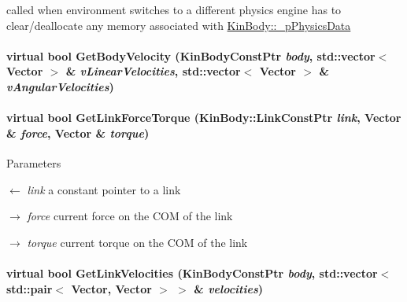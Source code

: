 called when environment switches to a different physics engine has to clear/deallocate any memory associated with \hyperlink{classOpenRAVE_1_1KinBody_a3f8a2e40760cf2ee75f604c0f18b27ec}{KinBody::\_\-pPhysicsData} \hypertarget{classOpenRAVE_1_1PhysicsEngineBase_a1a58013a452eea3921fb0ddcfb263813}{
\paragraph[{GetBodyVelocity}]{\setlength{\rightskip}{0pt plus 5cm}virtual bool GetBodyVelocity (KinBodyConstPtr {\em body}, \/  std::vector$<$ Vector $>$ \& {\em vLinearVelocities}, \/  std::vector$<$ Vector $>$ \& {\em vAngularVelocities})}\hfill}
\label{classOpenRAVE_1_1PhysicsEngineBase_a1a58013a452eea3921fb0ddcfb263813}
\hypertarget{classOpenRAVE_1_1PhysicsEngineBase_ac1814e555930327871aa74a002eb11ec}{
\paragraph[{GetLinkForceTorque}]{\setlength{\rightskip}{0pt plus 5cm}virtual bool GetLinkForceTorque (KinBody::LinkConstPtr {\em link}, \/  Vector \& {\em force}, \/  Vector \& {\em torque})}\hfill}
\label{classOpenRAVE_1_1PhysicsEngineBase_ac1814e555930327871aa74a002eb11ec}

\begin{DoxyParams}{Parameters}
\item[\mbox{$\leftarrow$} {\em link}]a constant pointer to a link \item[\mbox{$\rightarrow$} {\em force}]current force on the COM of the link \item[\mbox{$\rightarrow$} {\em torque}]current torque on the COM of the link \end{DoxyParams}
\hypertarget{classOpenRAVE_1_1PhysicsEngineBase_a4ab5cdca35ec2cc52158345188d370e2}{
\paragraph[{GetLinkVelocities}]{\setlength{\rightskip}{0pt plus 5cm}virtual bool GetLinkVelocities (KinBodyConstPtr {\em body}, \/  std::vector$<$ std::pair$<$ Vector, Vector $>$ $>$ \& {\em velocities})}\hfill}
\label{classOpenRAVE_1_1PhysicsEngineBase_a4ab5cdca35ec2cc52158345188d370e2}


